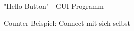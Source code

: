 \begin{figure}[ht]
	\centering
	\caption[]{"Hello Button" - GUI Programm}
\end{figure}

\begin{figure}[ht]
	\centering
	\caption[]{Counter Beispiel: Connect mit sich selbst}
\end{figure}


